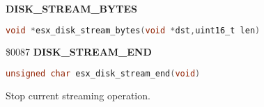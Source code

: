 %
%

\textbf{DISK\_STREAM\_BYTES}

\begin{lstlisting}[language=C]
void *esx_disk_stream_bytes(void *dst,uint16_t len)
\end{lstlisting}

\$0087 \textbf{DISK\_STREAM\_END}

\begin{lstlisting}[language=C]
unsigned char esx_disk_stream_end(void)
\end{lstlisting}

Stop current streaming operation.

%

